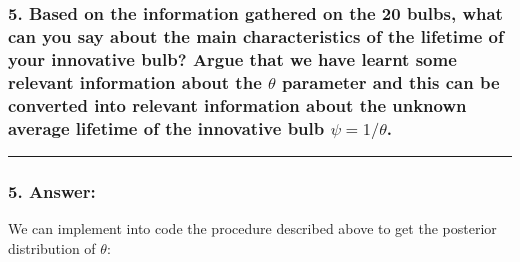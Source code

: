 \documentclass[
]{article}
\begin{document}
\hypertarget{based-on-the-information-gathered-on-the-20-bulbs-what-can-you-say-about-the-main-characteristics-of-the-lifetime-of-your-innovative-bulb-argue-that-we-have-learnt-some-relevant-information-about-the-theta-parameter-and-this-can-be-converted-into-relevant-information-about-the-unknown-average-lifetime-of-the-innovative-bulb-psi1theta.}{%
\subsubsection{\texorpdfstring{5. Based on the information gathered on
the 20 bulbs, what can you say about the main characteristics of the
lifetime of your innovative bulb? Argue that we have learnt some
relevant information about the \(\theta\) parameter and this can be
converted into relevant information about the unknown average lifetime
of the innovative bulb
\(\psi=1/\theta\).}{5. Based on the information gathered on the 20 bulbs, what can you say about the main characteristics of the lifetime of your innovative bulb? Argue that we have learnt some relevant information about the \textbackslash theta parameter and this can be converted into relevant information about the unknown average lifetime of the innovative bulb \textbackslash psi=1/\textbackslash theta.}}\label{based-on-the-information-gathered-on-the-20-bulbs-what-can-you-say-about-the-main-characteristics-of-the-lifetime-of-your-innovative-bulb-argue-that-we-have-learnt-some-relevant-information-about-the-theta-parameter-and-this-can-be-converted-into-relevant-information-about-the-unknown-average-lifetime-of-the-innovative-bulb-psi1theta.}}

\begin{center}\rule{0.5\linewidth}{0.5pt}\end{center}

\hypertarget{answer-8}{%
\subsubsection{5. Answer:}\label{answer-8}}

We can implement into code the procedure described above to get the
posterior distribution of \(\theta\):
\end{document}
